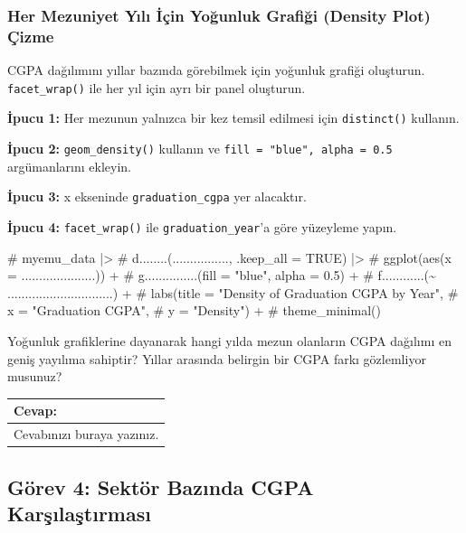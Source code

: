 \documentclass[
  11pt,
  a4paper,
  DIV=11,
  numbers=noendperiod]{scrartcl}
\newenvironment{Shaded}{\begin{snugshade}}{\end{snugshade}}
\newcommand{\CommentTok}[1]{\textcolor[rgb]{0.37,0.37,0.37}{#1}}
\begin{document}
\subsubsection{Her Mezuniyet Yılı İçin Yoğunluk Grafiği (Density Plot)
Çizme}\label{her-mezuniyet-yux131lux131-iuxe7in-youx11funluk-grafiux11fi-density-plot-uxe7izme}

CGPA dağılımını yıllar bazında görebilmek için yoğunluk grafiği
oluşturun. \texttt{facet\_wrap()} ile her yıl için ayrı bir panel
oluşturun.

\textbf{İpucu 1:} Her mezunun yalnızca bir kez temsil edilmesi için
\texttt{distinct()} kullanın.

\textbf{İpucu 2:} \texttt{geom\_density()} kullanın ve
\texttt{fill\ =\ "blue",\ alpha\ =\ 0.5} argümanlarını ekleyin.

\textbf{İpucu 3:} x ekseninde \texttt{graduation\_cgpa} yer alacaktır.

\textbf{İpucu 4:} \texttt{facet\_wrap()} ile \texttt{graduation\_year}'a
göre yüzeyleme yapın.

\begin{Shaded}
\begin{Highlighting}[]
\CommentTok{\# myemu\_data |\textgreater{}}
\CommentTok{\#   d........(................, .keep\_all = TRUE) |\textgreater{}}
\CommentTok{\#   ggplot(aes(x = .....................)) +}
\CommentTok{\#   g...............(fill = "blue", alpha = 0.5) +}
\CommentTok{\#   f............(\textasciitilde{} ..............................) +}
\CommentTok{\#   labs(title = "Density of Graduation CGPA by Year",}
\CommentTok{\#        x = "Graduation CGPA",}
\CommentTok{\#        y = "Density") +}
\CommentTok{\#   theme\_minimal()}
\end{Highlighting}
\end{Shaded}

Yoğunluk grafiklerine dayanarak hangi yılda mezun olanların CGPA
dağılımı en geniş yayılıma sahiptir? Yıllar arasında belirgin bir CGPA
farkı gözlemliyor musunuz?

\begin{longtable}[]{@{}l@{}}
\toprule\noalign{}
Cevap: \\
\midrule\noalign{}
\endhead
\bottomrule\noalign{}
\endlastfoot
Cevabınızı buraya yazınız. \\
\end{longtable}

\subsection{Görev 4: Sektör Bazında CGPA
Karşılaştırması}\label{guxf6rev-4-sektuxf6r-bazux131nda-cgpa-karux15fux131laux15ftux131rmasux131}
\end{document}
